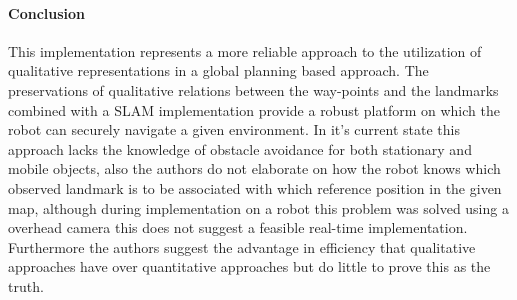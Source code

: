 \begin{itemize}
	\begin{figure}[h!]%
		\centering
		\qquad
		\label{fig:hand drawn map}%
	\end{figure}
	\paragraph{Conclusion} This implementation represents a more reliable approach to the utilization of qualitative representations in a global planning based approach. The preservations of qualitative relations between the way-points and the landmarks combined with a SLAM implementation provide a robust platform on which the robot can securely navigate a given environment. In it's current state this approach lacks the knowledge of obstacle avoidance for both stationary and mobile objects, also the authors do not elaborate on how the robot knows which observed landmark is to be associated with which reference position in the given map, although during implementation on a robot this problem was solved using a overhead camera this does not suggest a feasible real-time implementation. Furthermore the authors suggest the advantage in efficiency that qualitative approaches have over quantitative approaches but do little to prove this as the truth.
	

\end{itemize}

